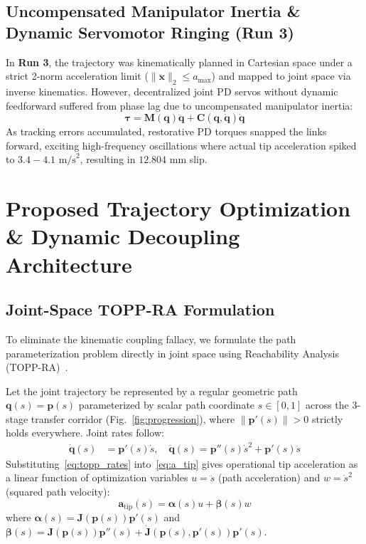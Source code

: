 \documentclass{article}
\begin{document}
\subsection{Uncompensated Manipulator Inertia \& Dynamic Servomotor Ringing (Run 3)}
In \textbf{Run 3}, the trajectory was kinematically planned in Cartesian space under a strict 2-norm acceleration limit ($\|\ddot{\mathbf{x}}\|_2 \le a_{\max}$) and mapped to joint space via inverse kinematics. However, decentralized joint PD servos without dynamic feedforward suffered from phase lag due to uncompensated manipulator inertia:
\begin{equation}
\boldsymbol{\tau} = \mathbf{M}(\mathbf{q})\ddot{\mathbf{q}} + \mathbf{C}(\mathbf{q}, \dot{\mathbf{q}})\dot{\mathbf{q}}
\end{equation}
As tracking errors accumulated, restorative PD torques snapped the links forward, exciting high-frequency oscillations where actual tip acceleration spiked to $3.4 - 4.1\text{ m/s}^2$, resulting in $12.804\text{ mm}$ slip.

\section{Proposed Trajectory Optimization \& Dynamic Decoupling Architecture}

\subsection{Joint-Space TOPP-RA Formulation}
To eliminate the kinematic coupling fallacy, we formulate the path parameterization problem directly in joint space using Reachability Analysis (TOPP-RA)~\cite{verscheure2009time, pham2018top}.

Let the joint trajectory be represented by a regular geometric path $\mathbf{q}(s) = \mathbf{p}(s)$ parameterized by scalar path coordinate $s \in [0, 1]$ across the 3-stage transfer corridor (Fig.~\ref{fig:progression}), where $\|\mathbf{p}'(s)\| > 0$ strictly holds everywhere. Joint rates follow:
\begin{align}
\dot{\mathbf{q}}(s) &= \mathbf{p}'(s)\dot{s}, \quad \ddot{\mathbf{q}}(s) = \mathbf{p}''(s)\dot{s}^2 + \mathbf{p}'(s)\ddot{s} \label{eq:topp_rates}
\end{align}
Substituting~\eqref{eq:topp_rates} into~\eqref{eq:a_tip} gives operational tip acceleration as a linear function of optimization variables $u = \ddot{s}$ (path acceleration) and $w = \dot{s}^2$ (squared path velocity):
\begin{equation}
\mathbf{a}_{\text{tip}}(s) = \boldsymbol{\alpha}(s)u + \boldsymbol{\beta}(s)w
\label{eq:topp_a_linear}
\end{equation}
where $\boldsymbol{\alpha}(s) = \mathbf{J}(\mathbf{p}(s))\mathbf{p}'(s)$ and $\boldsymbol{\beta}(s) = \mathbf{J}(\mathbf{p}(s))\mathbf{p}''(s) + \dot{\mathbf{J}}(\mathbf{p}(s), \mathbf{p}'(s))\mathbf{p}'(s)$.
\end{document}
